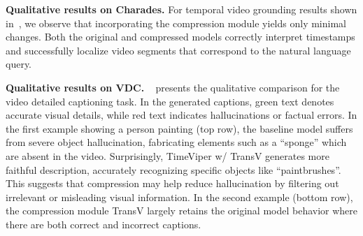 \documentclass[10pt,twocolumn,letterpaper]{article}
\begin{document}
\noindent\textbf{Qualitative results on Charades.}
For temporal video grounding results shown in~, we observe that incorporating the compression module yields only minimal changes. Both the original and compressed models correctly interpret timestamps and successfully localize video segments that correspond to the natural language query.

\noindent\textbf{Qualitative results on VDC.}
~ presents the qualitative comparison for the video detailed captioning task. 
In the generated captions, green text denotes accurate visual details, while red text indicates hallucinations or factual errors.
In the first example showing a person painting (top row), the baseline model suffers from severe object hallucination, fabricating elements such as a ``sponge'' which are absent in the video. 
Surprisingly, TimeViper w/ TransV generates more faithful description, accurately recognizing specific objects like ``paintbrushes''. 
This suggests that compression may help reduce hallucination by filtering out irrelevant or misleading visual information.
In the second example (bottom row), the compression module TransV largely retains the original model behavior where there are both correct and incorrect captions.




\end{document}
